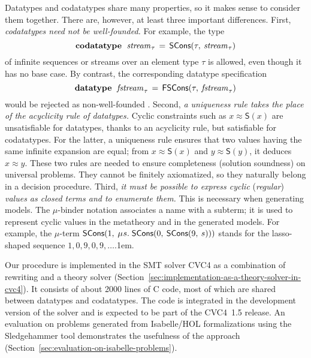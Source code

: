 \documentclass[smallcondensed,draft]{svjour3}
\newcommand\MU{\vvthinspace\mu\vvthinspace}
\newcommand\afterLdots{\kern.1em} %
\newcommand\cpp{C\nobreak\raisebox{.05ex}{+}\nobreak\raisebox{.05ex}{+}}
\newcommand\keyw[1]{\textbf{#1}}
\newcommand\const[1]{\textsf{#1}}
\newcommand\ty[1]{\textit{#1}}
\newcommand{\teq}{\approx}
\newcommand\vvthinspace{\kern+0.041667em}
\newcommand\vthinspace{\kern+0.083333em}
\begin{document}
Datatypes and codatatypes share many properties, so it makes sense
to consider them together. There are, however, at least three important
differences.
%
First, \emph{codatatypes need not be well-founded.}
For example, the type
$$\vthinspace\keyw{codatatype}~\;\ty{stream}_{\vthinspace\tau} \,=\allowbreak\, \const{SCons}(\tau,\allowbreak\: \ty{stream}_{\vthinspace\tau})\vthinspace$$
of infinite sequences or streams over an element type $\tau$ is
allowed, even though it has no base case. By contrast, the
corresponding datatype specification
$$\vthinspace\keyw{datatype}~\;\ty{fstream}_{\vthinspace\tau} \,=\allowbreak\, \const{FSCons}(\tau,\allowbreak\: \ty{fstream}_{\vthinspace\tau})\vthinspace$$
would be rejected as non-well-founded
\cite{blanchette-et-al-2015-esop}.
%
Second, \emph{a uniqueness rule takes the place of the acyclicity rule of datatypes.}
Cyclic constraints such as
$x \teq \const{S}(x)$ %
are unsatisfiable for datatypes,
thanks to an acyclicity rule,
but satisfiable for codatatypes. 
For the latter, a uniqueness rule ensures that two values
having the same infinite expansion are equal; from $x
\teq \const{S}(x)$ and
$y \teq \const{S}(y)$, it deduces $x \teq y$.
These two rules are needed to ensure completeness
(solution soundness) on universal problems. %
They cannot be finitely axiomatized, so they naturally belong in
a decision procedure.
%
Third, \emph{it must be possible to express cyclic }(\emph{regular}) \emph{values as closed terms and
to enumerate them.} This is necessary when generating models.
The $\mu$-binder notation associates a name with
a subterm; it is used to represent cyclic values in the metatheory and
in the generated models. For example,
the $\mu$-term $\const{SCons}(1,\: \MU s.\; \const{SCons}(0,\: \const{SCons}(9,\: s)))$
stands for the lasso-shaped sequence $1, 0, 9, 0, 9, %
\ldots$\afterLdots.


Our procedure is implemented in the SMT solver CVC4 \cite{barrett-et-al-2011} as a combination
of rewriting and a theory solver (Section~\ref{sec:implementation-as-a-theory-solver-in-cvc4}).
It consists of about 2000 lines of \cpp{} code,
most of which are shared between datatypes and codatatypes. The code is
integrated in the development version of the solver and is expected to be part
of the CVC4~1.5 release.
%
An evaluation on %
problems generated from Isabelle/HOL \cite{nipkow-et-al-2002}
formalizations using the Sledgehammer tool \cite{blanchette-et-al-2013-smt}
demonstrates the usefulness of the approach (Section~\ref{sec:evaluation-on-isabelle-problems}).
\end{document}
